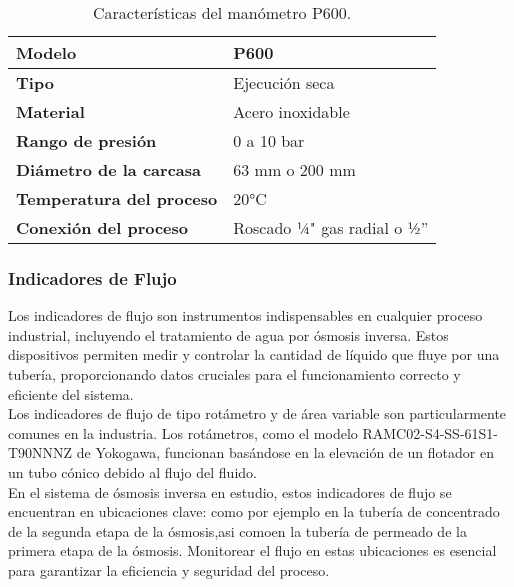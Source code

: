 

\begin{table}[H]
    \centering
    \caption{Características del manómetro P600.}
    \label{table:manometro}
    \begin{tabular}{| L{6cm} | L{6cm} |}
        
        \hline
        \textbf{Modelo} & P600  \\
        \hline
        \textbf{Tipo} & Ejecución seca  \\
        \hline
        \textbf{Material} & Acero inoxidable  \\
        \hline
        \textbf{Rango de presión} & 0 a 10 bar  \\
        \hline
        \textbf{Diámetro de la carcasa} & 63 mm o 200 mm  \\
        \hline
        \textbf{Temperatura del proceso} & 20°C  \\
        \hline
        \textbf{Conexión del proceso} & Roscado ¼" gas radial o ½''  \\
        \hline
    \end{tabular}
\end{table}


\subsubsection{Indicadores de Flujo}

Los indicadores de flujo son instrumentos indispensables en cualquier proceso industrial, 
incluyendo el tratamiento de agua por ósmosis inversa. Estos dispositivos permiten medir 
y controlar la cantidad de líquido que fluye por una tubería, proporcionando datos cruciales 
para el funcionamiento correcto y eficiente del sistema.\\

Los indicadores de flujo de tipo rotámetro y de área variable son particularmente comunes 
en la industria. Los rotámetros, como el modelo RAMC02-S4-SS-61S1-T90NNNZ de Yokogawa, 
funcionan basándose en la elevación de un flotador en un tubo cónico debido al flujo del 
fluido.\\

En el sistema de ósmosis inversa en estudio, estos indicadores de flujo se encuentran en 
ubicaciones clave: como por ejemplo en la tubería de concentrado 
de la segunda etapa de la ósmosis,asi comoen la tubería de permeado de la primera etapa de la ósmosis. Monitorear 
el flujo en estas ubicaciones es esencial para garantizar la eficiencia y seguridad del 
proceso.\\

